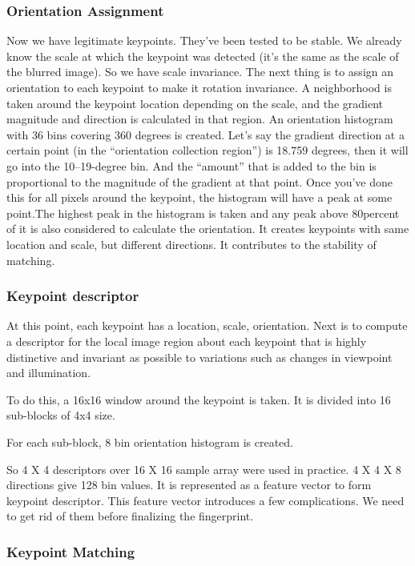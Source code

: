 \documentclass{article}
\begin{document}
\subsubsection{Orientation Assignment}

Now we have legitimate keypoints. They’ve been tested to be stable. We already know the scale at which the keypoint was detected (it’s the same as the scale of the blurred image). So we have scale invariance. The next thing is to assign an orientation to each keypoint to make it rotation invariance.
A neighborhood is taken around the keypoint location depending on the scale, and the gradient magnitude and direction is calculated in that region. An orientation histogram with 36 bins covering 360 degrees is created. Let's say the gradient direction at a certain point (in the “orientation collection region”) is 18.759 degrees, then it will go into the 10–19-degree bin. And the “amount” that is added to the bin is proportional to the magnitude of the gradient at that point. Once you’ve done this for all pixels around the keypoint, the histogram will have a peak at some point.The highest peak in the histogram is taken and any peak above 80percent of it is also considered to calculate the orientation. It creates keypoints with same location and scale, but different directions. It contributes to the stability of matching.

\subsubsection{Keypoint descriptor}

At this point, each keypoint has a location, scale, orientation. Next is to compute a descriptor for the local image region about each keypoint that is highly distinctive and invariant as possible to variations such as changes in viewpoint and illumination.

To do this, a 16x16 window around the keypoint is taken. It is divided into 16 sub-blocks of 4x4 size.

For each sub-block, 8 bin orientation histogram is created.

So 4 X 4 descriptors over 16 X 16 sample array were used in practice. 4 X 4 X 8 directions give 128 bin values. It is represented as a feature vector to form keypoint descriptor. This feature vector introduces a few complications. We need to get rid of them before finalizing the fingerprint.

\subsubsection{Keypoint Matching}
\end{document}
